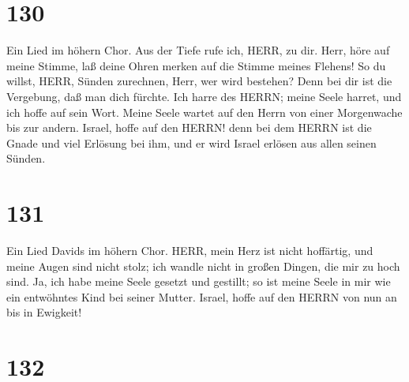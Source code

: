 \hypertarget{section-129}{%
\section{130}\label{section-129}}

 Ein Lied im höhern Chor. Aus der Tiefe rufe ich, HERR, zu
dir.  Herr, höre auf meine Stimme, laß deine Ohren merken
auf die Stimme meines Flehens!  So du willst, HERR, Sünden
zurechnen, Herr, wer wird bestehen?  Denn bei dir ist die
Vergebung, daß man dich fürchte.  Ich harre des HERRN; meine
Seele harret, und ich hoffe auf sein Wort.  Meine Seele
wartet auf den Herrn von einer Morgenwache bis zur andern. 
Israel, hoffe auf den HERRN! denn bei dem HERRN ist die Gnade und viel
Erlösung bei ihm,  und er wird Israel erlösen aus allen
seinen Sünden.

\hypertarget{section-130}{%
\section{131}\label{section-130}}

 Ein Lied Davids im höhern Chor. HERR, mein Herz ist nicht
hoffärtig, und meine Augen sind nicht stolz; ich wandle nicht in großen
Dingen, die mir zu hoch sind.  Ja, ich habe meine Seele
gesetzt und gestillt; so ist meine Seele in mir wie ein entwöhntes Kind
bei seiner Mutter.  Israel, hoffe auf den HERRN von nun an
bis in Ewigkeit!

\hypertarget{section-131}{%
\section{132}\label{section-131}}

